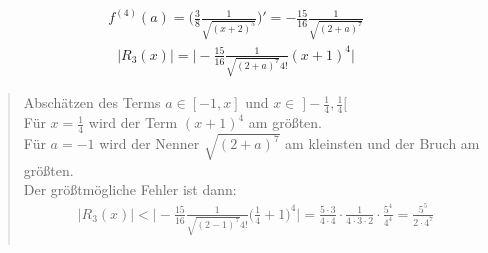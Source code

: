 \begin{align*}
f^{(4)}(a)=\bigg(\frac{3}{8}\frac{1}{\sqrt{(x+2)^{5}}}\bigg)'=-\frac{15}{16}\frac{1}{\sqrt{(2+a)^7}}
\end{align*}
\begin{align*}
\big|R_3(x)\big|=\bigg|-\frac{15}{16}\frac{1}{\sqrt{(2+a)^7}4!}(x+1)^4\bigg|
\end{align*}
\begin{quote}
Abschätzen des Terms $a\in [-1,x]$ und $ x\in\;]-\frac{1}{4},\frac{1}{4}[ $\\
Für $ x=\frac{1}{4} $ wird der Term $ (x+1)^4 $ am größten.\\
Für $ a=-1 $ wird der Nenner $ \sqrt{(2+a)^7} $ am kleinsten und der Bruch am größten.\\
Der größtmögliche Fehler ist dann:\\
\begin{align*}
\big|R_3(x)\big|<\bigg|-\frac{15}{16}\frac{1}{\sqrt{(2-1)^7}4!}\bigg(\frac{1}{4}+1\bigg)^4\bigg|=\frac{5\cdot3}{4\cdot4}\cdot\frac{1}{4\cdot3\cdot 2}\cdot\frac{5^4}{4^4}=\frac{5^5}{2\cdot4^7}\\
\end{align*}


\end{quote}
